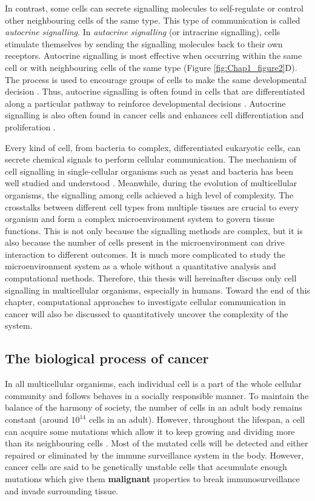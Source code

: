 In contrast, some cells can secrete signalling molecules to self-regulate or control other neighbouring cells of the same type. This type of communication is called \textit{autocrine signalling}. In \textit{autocrine signalling} (or intracrine signalling), cells stimulate themselves by sending the signalling molecules back to their own receptors. Autocrine signalling is most effective when occurring within the same cell or with neighbouring cells of the same type (Figure \ref{fig:Chap1_figure2}D). The process is used to encourage groups of cells to make the same developmental decision \cite{armingol2021deciphering, alberts2018molecular}. Thus, autocrine signalling is often found in cells that are differentiated along a particular pathway to reinforce developmental decisions \cite{alberts2018molecular}. Autocrine signalling is also often found in cancer cells and enhances cell differentiation and proliferation \cite{sporn1985autocrine}.  

Every kind of cell, from bacteria to complex, differentiated eukaryotic cells, can secrete chemical signals to perform cellular communication. The mechanism of cell signalling in single-cellular organisms such as yeast and bacteria has been well studied and understood \cite{alberts2018molecular}. Meanwhile, during the evolution of multicellular organisms, the signalling among cells achieved a high level of complexity. The crosstalks between different cell types from multiple tissues are crucial to every organism and form a complex microenvironment system to govern tissue functions. This is not only because the signalling methods are complex, but it is also because the number of cells present in the microenvironment can drive interaction to different outcomes. It is much more complicated to study the microenvironment system as a whole without a quantitative analysis and computational methods. Therefore, this thesis will hereinafter discuss only cell signalling in multicellular organisms, especially in humans. Toward the end of this chapter, computational approaches to investigate cellular communication in cancer will also be discussed to quantitatively uncover the complexity of the system. 

\subsection{The biological process of cancer}
In all multicellular organisms, each individual cell is a part of the whole cellular community and follows behaves in a socially responsible manner. To maintain the balance of the harmony of society, the number of cells in an adult body remains constant (around $10^{14}$ cells in an adult). However, throughout the lifespan, a cell can acquire some mutations which allow it to keep growing and dividing more than its neighbouring cells \cite{alberts2018molecular, greaves2012clonal}. Most of the mutated cells will be detected and either repaired or eliminated by the immune surveillance system in the body. However, cancer cells are said to be genetically unstable cells that accumulate enough mutations which give them \textbf{malignant} properties to break immunosurveillance and invade surrounding tissue. 


